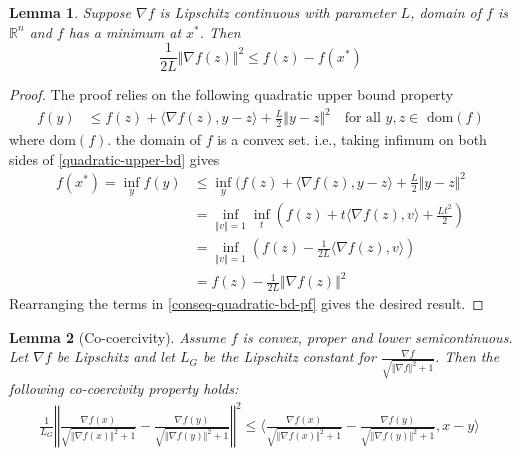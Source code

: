 \documentclass{article}
\newtheorem{lemma}{Lemma}
\begin{document}
\begin{lemma}\label{conseq-quadratic-bd}
    Suppose $\nabla f$ is Lipschitz continuous with parameter $L$,  domain of $f$ is $\mathbb R^n$ and $f$ has a minimum at $x^*$. Then
    $$\frac{1}{2L}\Vert\nabla f(z)\Vert^2\leq f(z)-f(x^*)$$
\end{lemma}
\begin{proof}
The proof relies on the following quadratic upper bound property
\begin{align}\label{quadratic-upper-bd}
f(y) &\leq f(z)+\langle \nabla f(z),y-z\rangle+\frac{L}{2}\Vert y-z\Vert^2 \quad \text{for all } y, z \in \text{ dom}(f)
\end{align}
where dom$(f)$. the domain of $f$ is a convex set. i.e., taking infimum on both sides of \ref{quadratic-upper-bd} gives
\begin{align}
        f(x^*)=\inf_y f(y) &\leq \inf_y(f(z)+\langle \nabla f(z),y-z\rangle+\frac{L}{2}\Vert y-z\Vert^2\nonumber\\ 
        &=\inf_{\Vert v \Vert=1}\inf_t \left (f(z)+t \langle \nabla f(z), v\rangle+\frac{Lt^2}{2} \right)\nonumber\\
        &=\inf_{\Vert v \Vert=1}\left (f(z)-\frac{1}{2L} \langle \nabla f(z), v\rangle \right)\nonumber\\
        &= f(z)-\frac{1}{2L}  \Vert\nabla f(z)\Vert^2 \label{conseq-quadratic-bd-pf}
\end{align}
Rearranging the terms in \ref{conseq-quadratic-bd-pf} gives the desired result.
\end{proof}

\begin{lemma}[Co-coercivity]\label{cocoer}
Assume $f$ is convex, proper and lower semicontinuous.
Let $\nabla f$ be Lipschitz and let $L_G$ be the Lipschitz constant for 
$\displaystyle \frac{\nabla f}{\sqrt{\Vert \nabla f \Vert^2 + 1}}$. 
Then the following co-coercivity property holds:
\begin{align}
\frac{1}{L_G}\left\Vert \frac{\nabla f(x)}{\sqrt{\Vert\nabla f(x)\Vert^2 +1}} - \frac{\nabla f(y)}{\sqrt{\Vert\nabla f(y) \Vert^2 +1}} \right\Vert^2 \leq \bigg \langle \frac{\nabla f(x)}{\sqrt{\Vert\nabla f(x)\Vert^2 +1}}- \frac{\nabla f(y)}{\sqrt{\Vert\nabla f(y)\Vert^2 +1}},x-y \bigg\rangle\
\end{align}
\end{lemma}
\end{document}
